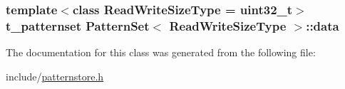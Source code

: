 \subsubsection[{data}]{\setlength{\rightskip}{0pt plus 5cm}template$<$class Read\+Write\+Size\+Type = uint32\+\_\+t$>$ {\bf t\+\_\+patternset} {\bf Pattern\+Set}$<$ Read\+Write\+Size\+Type $>$\+::data\hspace{0.3cm}{\ttfamily [protected]}}\label{classPatternSet_afa1d4a71d4b1f17a5fa5fba98f637687}


The documentation for this class was generated from the following file\+:\begin{DoxyCompactItemize}
\item 
include/\hyperlink{patternstore_8h}{patternstore.\+h}\end{DoxyCompactItemize}
